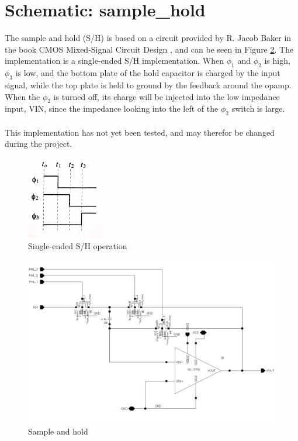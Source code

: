\documentclass[english, a4paper,11pt]{article}
\begin{document}
\section*{Schematic: sample\_hold}
The sample and hold (S/H) is based on a circuit provided by R. Jacob Baker in the book CMOS Mixed-Signal Circuit Design \cite{baker}, and can be seen in Figure \ref{sample:hold}. 
The implementation is a single-ended S/H implementation. When $\phi_{1}$ and $\phi_{2}$ is high, $\phi_{3}$ is low, and the bottom plate of the hold capacitor is charged by the input signal, 
while the top plate is held to ground by the feedback around the opamp. When the $\phi_{2}$ is turned off, its charge will be injected into the low impedance input, VIN, since the impedance 
looking into the left of the $\phi_{2}$ switch is large.\\
\\
This implementation has not yet been tested, and may therefor be changed during the project.\\
\begin{figure}[!ht]
 \centering
   \includegraphics[width=0.3\textwidth]{img/timing_sample_hold.jpg}
   \caption{Single-ended S/H operation \cite{baker}}
   \label{timing}
\end{figure}
\begin{figure}[!ht]
 \centering
   \includegraphics[width=\textwidth]{img/sample_hold}
   \caption{Sample and hold}
   \label{sample:hold}
\end{figure}
\end{document}

